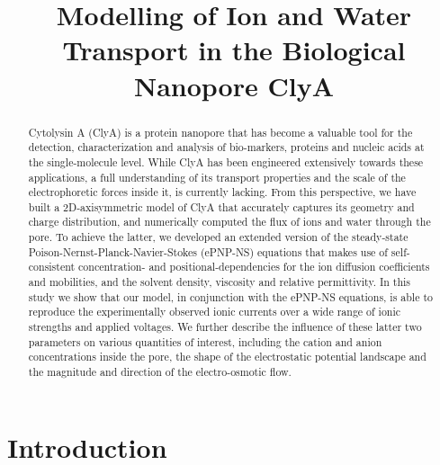 \documentclass[journal=ancac3,manuscript=article,etalmode=truncate,maxauthors=0,layout=twocolumn]{achemso}
\title{Modelling of Ion and Water Transport in the Biological Nanopore ClyA}
\begin{document}

\begin{abstract}
\footnotesize
Cytolysin A (ClyA) is a protein nanopore that has become a valuable tool for the detection, characterization 
and analysis of bio-markers, proteins and nucleic acids at the single-molecule level.  While ClyA has been 
engineered extensively towards these applications, a full understanding of its transport properties and the 
scale of the electrophoretic forces inside it, is currently lacking. From this perspective, we have built a 
2D-axisymmetric model of ClyA that accurately captures its geometry and charge distribution, and numerically 
computed the flux of ions and water through the pore. To achieve the latter, we developed an extended version 
of the steady-state Poison-Nernst-Planck-Navier-Stokes (ePNP-NS) equations that makes use of self-consistent 
concentration- and positional-dependencies for the ion diffusion coefficients and mobilities, and the solvent 
density, viscosity and relative permittivity. In this study we show that our model, in conjunction with the 
ePNP-NS equations, is able to reproduce the experimentally observed ionic currents over a wide range of ionic 
strengths and applied voltages. We further describe the influence of these latter two parameters on various 
quantities of interest, including the cation and anion concentrations inside the pore, the shape of the 
electrostatic potential landscape and the magnitude and direction of the electro-osmotic flow.
\end{abstract}

\section{Introduction}


\end{document}

